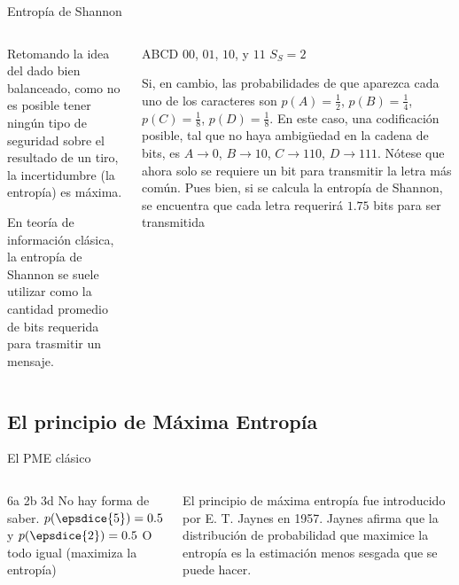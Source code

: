 \begin{frame}{Entropía de Shannon}
    \begin{columns}
        \begin{column}{0.5\textwidth}
            Retomando la idea del dado bien balanceado, como no es posible tener ningún tipo de seguridad sobre el resultado de un tiro, la incertidumbre (la entropía) es máxima.

            \pause

            En teoría de información clásica, la entropía de Shannon se suele utilizar como la cantidad promedio de bits requerida para trasmitir un mensaje.

        \end{column}
        \pause
        \begin{column}{0.5\textwidth}
            ABCD $00$, $01$, $10$, y $11$ $S_{S}=2$

            \pause

            Si, en cambio, las probabilidades de que aparezca cada uno de los caracteres son $p(A)=\frac{1}{2}$, $p(B)=\frac{1}{4}$, $p(C)=\frac{1}{8}$, $p(D)=\frac{1}{8}$. En este caso, una codificación posible, tal que no haya ambigüedad en la cadena de bits, es $A \rightarrow 0$, $B\rightarrow 10$, $C\rightarrow 110$, $D\rightarrow 111$. Nótese que ahora solo se requiere un bit para transmitir la letra más común. Pues bien, si se calcula la entropía de Shannon, se encuentra que cada letra requerirá $1.75$ bits para ser transmitida


        \end{column}
    \end{columns}
\end{frame}


\subsection{El principio de Máxima Entropía}

\begin{frame}{El PME clásico}
    \begin{columns}
        \begin{column}{0.5\textwidth}
            {6a 2b 3d}
            No hay forma de saber.
            $p(\epsdice{5})=0.5$ y $p(\epsdice{2})=0.5$
            O todo igual (maximiza la entropía)
        \end{column}
        \begin{column}{0.5\textwidth}
            El principio de máxima entropía fue introducido por E. T. Jaynes en 1957.
            Jaynes afirma que la distribución de probabilidad que maximice la entropía es la estimación menos sesgada que se puede hacer.
        \end{column}
    \end{columns}
\end{frame}

